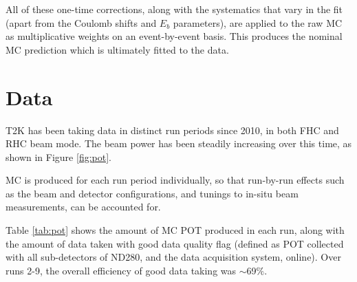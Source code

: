 All of these one-time corrections, along with the systematics that vary in the fit (apart from the Coulomb shifts and $E_{b}$ parameters), are applied to the raw MC as multiplicative weights on an event-by-event basis. This produces the nominal MC prediction which is ultimately fitted to the data.

\section{Data}\label{sec:data}

T2K has been taking data in distinct run periods since 2010, in both FHC and RHC beam mode. The beam power has been steadily increasing over this time, as shown in Figure \ref{fig:pot}.

MC is produced for each run period individually, so that run-by-run effects such as the beam and detector configurations, and tunings to in-situ beam measurements, can be accounted for.

Table \ref{tab:pot} shows the amount of MC POT produced in each run, along with the amount of data taken with good data quality flag (defined as POT collected with all sub-detectors of ND280, and the data acquisition system, online). Over runs 2-9, the overall efficiency of good data taking was $\sim$69$\%$.

